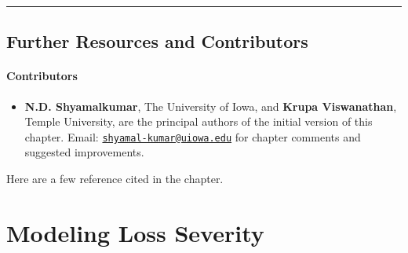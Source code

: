 \documentclass[]{book}
\providecommand{\tightlist}{%
  \setlength{\itemsep}{0pt}\setlength{\parskip}{0pt}}
\theoremstyle{definition}
\theoremstyle{definition}
\theoremstyle{definition}
\theoremstyle{remark}
\begin{document}
\begin{center}\rule{0.5\linewidth}{\linethickness}\end{center}

\section{Further Resources and
Contributors}\label{Freq-further-reading-and-resources}

\subsubsection*{Contributors}\label{contributors-1}

\begin{itemize}
\tightlist
\item
  \textbf{N.D. Shyamalkumar}, The University of Iowa, and \textbf{Krupa
  Viswanathan}, Temple University, are the principal authors of the
  initial version of this chapter. Email:
  \href{mailto:shyamal-kumar@uiowa.edu}{\nolinkurl{shyamal-kumar@uiowa.edu}}
  for chapter comments and suggested improvements.
\end{itemize}

Here are a few reference cited in the chapter.

\chapter{Modeling Loss Severity}\label{C:Severity}
\end{document}
